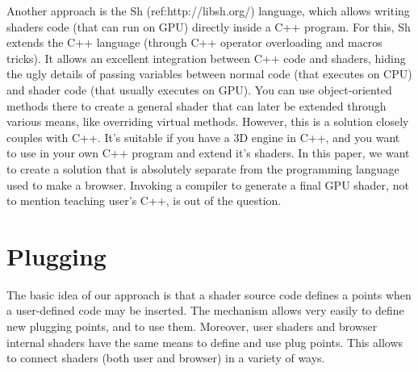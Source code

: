 \documentclass{acmsiggraph}                     %
\begin{document}

Another approach is the Sh (ref:http://libsh.org/) language, which
allows writing shaders code (that can run on GPU) directly inside a
C++ program. For this, Sh extends the C++ language (through C++
operator overloading and macros tricks). It allows an excellent
integration between C++ code and shaders, hiding the ugly details of
passing variables between normal code (that executes on CPU) and
shader code (that usually executes on GPU). You can use
object-oriented methods there to create a general shader that can
later be extended through various means, like overriding virtual
methods. However, this is a solution closely couples with C++. It's
suitable if you have a 3D engine in C++, and you want to use in your
own C++ program and extend it's shaders. In this paper, we want to
create a solution that is absolutely separate from the programming
language used to make a browser. Invoking a compiler to generate a
final GPU shader, not to mention teaching user's C++, is out of the
question.


\section{Plugging}

The basic idea of our approach is that a shader source code defines
a points when a user-defined code may be inserted. The mechanism
allows very easily to define new plugging points, and to use
them. Moreover, user shaders and browser internal shaders have the
same means to define and use plug points. This allows to connect
shaders (both user and browser) in a variety of ways.
\end{document}
